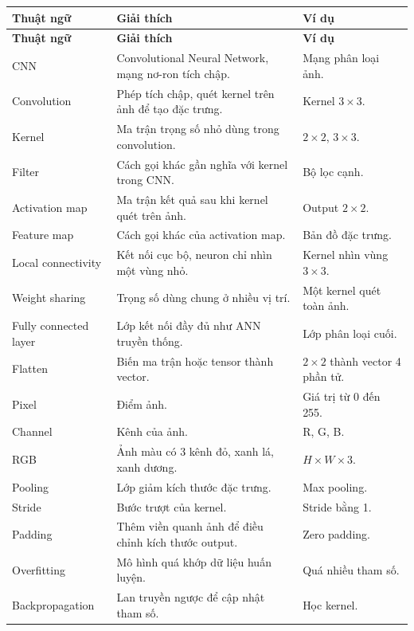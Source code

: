 \documentclass[12pt,a4paper]{report}
\begin{document}
\small
\begin{longtable}{p{}p{}p{}}
\toprule
\textbf{Thuật ngữ} & \textbf{Giải thích} & \textbf{Ví dụ} \\
\midrule
\endfirsthead

\toprule
\textbf{Thuật ngữ} & \textbf{Giải thích} & \textbf{Ví dụ} \\
\midrule
\endhead

CNN & Convolutional Neural Network, mạng nơ-ron tích chập. & Mạng phân loại ảnh. \\

Convolution & Phép tích chập, quét kernel trên ảnh để tạo đặc trưng. & Kernel $3\times3$. \\

Kernel & Ma trận trọng số nhỏ dùng trong convolution. & $2\times2$, $3\times3$. \\

Filter & Cách gọi khác gần nghĩa với kernel trong CNN. & Bộ lọc cạnh. \\

Activation map & Ma trận kết quả sau khi kernel quét trên ảnh. & Output $2\times2$. \\

Feature map & Cách gọi khác của activation map. & Bản đồ đặc trưng. \\

Local connectivity & Kết nối cục bộ, neuron chỉ nhìn một vùng nhỏ. & Kernel nhìn vùng $3\times3$. \\

Weight sharing & Trọng số dùng chung ở nhiều vị trí. & Một kernel quét toàn ảnh. \\

Fully connected layer & Lớp kết nối đầy đủ như ANN truyền thống. & Lớp phân loại cuối. \\

Flatten & Biến ma trận hoặc tensor thành vector. & $2\times2$ thành vector 4 phần tử. \\

Pixel & Điểm ảnh. & Giá trị từ 0 đến 255. \\

Channel & Kênh của ảnh. & R, G, B. \\

RGB & Ảnh màu có 3 kênh đỏ, xanh lá, xanh dương. & $H\times W\times3$. \\

Pooling & Lớp giảm kích thước đặc trưng. & Max pooling. \\

Stride & Bước trượt của kernel. & Stride bằng 1. \\

Padding & Thêm viền quanh ảnh để điều chỉnh kích thước output. & Zero padding. \\

Overfitting & Mô hình quá khớp dữ liệu huấn luyện. & Quá nhiều tham số. \\

Backpropagation & Lan truyền ngược để cập nhật tham số. & Học kernel. \\

\bottomrule
\end{longtable}
\normalsize
\end{document}
